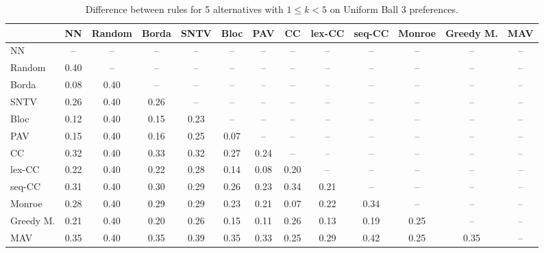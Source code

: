 
\begin{table*}[htbp]
\centering
\begin{tabular}{lcccccccccccc}
\toprule
 & NN & Random & Borda & SNTV & Bloc & PAV & CC & lex-CC & seq-CC & Monroe & Greedy M. & MAV \\
\midrule
NN & -- & -- & -- & -- & -- & -- & -- & -- & -- & -- & -- & -- \\
Random & \cellcolor{blue!40} 0.40 & -- & -- & -- & -- & -- & -- & -- & -- & -- & -- & -- \\
Borda & \cellcolor{blue!8} 0.08 & \cellcolor{blue!40} 0.40 & -- & -- & -- & -- & -- & -- & -- & -- & -- & -- \\
SNTV & \cellcolor{blue!26} 0.26 & \cellcolor{blue!40} 0.40 & \cellcolor{blue!26} 0.26 & -- & -- & -- & -- & -- & -- & -- & -- & -- \\
Bloc & \cellcolor{blue!12} 0.12 & \cellcolor{blue!40} 0.40 & \cellcolor{blue!15} 0.15 & \cellcolor{blue!23} 0.23 & -- & -- & -- & -- & -- & -- & -- & -- \\
PAV & \cellcolor{blue!15} 0.15 & \cellcolor{blue!40} 0.40 & \cellcolor{blue!16} 0.16 & \cellcolor{blue!25} 0.25 & \cellcolor{blue!7} 0.07 & -- & -- & -- & -- & -- & -- & -- \\
CC & \cellcolor{blue!32} 0.32 & \cellcolor{blue!40} 0.40 & \cellcolor{blue!33} 0.33 & \cellcolor{blue!32} 0.32 & \cellcolor{blue!27} 0.27 & \cellcolor{blue!24} 0.24 & -- & -- & -- & -- & -- & -- \\
lex-CC & \cellcolor{blue!22} 0.22 & \cellcolor{blue!40} 0.40 & \cellcolor{blue!22} 0.22 & \cellcolor{blue!28} 0.28 & \cellcolor{blue!14} 0.14 & \cellcolor{blue!8} 0.08 & \cellcolor{blue!20} 0.20 & -- & -- & -- & -- & -- \\
seq-CC & \cellcolor{blue!31} 0.31 & \cellcolor{blue!40} 0.40 & \cellcolor{blue!30} 0.30 & \cellcolor{blue!28} 0.29 & \cellcolor{blue!26} 0.26 & \cellcolor{blue!23} 0.23 & \cellcolor{blue!34} 0.34 & \cellcolor{blue!21} 0.21 & -- & -- & -- & -- \\
Monroe & \cellcolor{blue!28} 0.28 & \cellcolor{blue!40} 0.40 & \cellcolor{blue!28} 0.29 & \cellcolor{blue!28} 0.29 & \cellcolor{blue!23} 0.23 & \cellcolor{blue!21} 0.21 & \cellcolor{blue!7} 0.07 & \cellcolor{blue!22} 0.22 & \cellcolor{blue!34} 0.34 & -- & -- & -- \\
Greedy M. & \cellcolor{blue!21} 0.21 & \cellcolor{blue!40} 0.40 & \cellcolor{blue!20} 0.20 & \cellcolor{blue!26} 0.26 & \cellcolor{blue!15} 0.15 & \cellcolor{blue!11} 0.11 & \cellcolor{blue!26} 0.26 & \cellcolor{blue!13} 0.13 & \cellcolor{blue!19} 0.19 & \cellcolor{blue!25} 0.25 & -- & -- \\
MAV & \cellcolor{blue!35} 0.35 & \cellcolor{blue!40} 0.40 & \cellcolor{blue!35} 0.35 & \cellcolor{blue!39} 0.39 & \cellcolor{blue!35} 0.35 & \cellcolor{blue!33} 0.33 & \cellcolor{blue!25} 0.25 & \cellcolor{blue!28} 0.29 & \cellcolor{blue!42} 0.42 & \cellcolor{blue!25} 0.25 & \cellcolor{blue!35} 0.35 & -- \\
\bottomrule
\end{tabular}

\caption{Difference between rules for 5 alternatives with $1 \leq k < 5$ on Uniform Ball 3 preferences.}
\label{tab:rule_distance_heatmap-m=[5]-pref_dist=euclidean__args__dimensions=3_-_space=uniform_ball}
\end{table*}
    